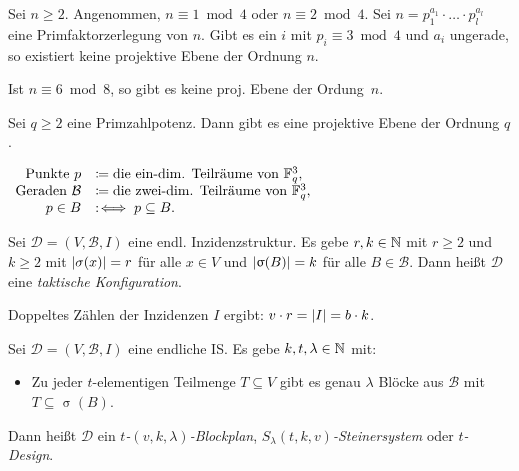 \documentclass{cheat-sheet}
\newcommand{\F}{\mathbb{F}} %
\newcommand{\Design}{\mathcal{D}} %
\newcommand{\Blocks}{\mathcal{B}} %
\begin{document}
\begin{satz}
  Sei $n \geq 2$.
  Angenommen, $n \equiv 1 \bmod 4$ oder $n \equiv 2 \bmod 4$.
  Sei $n = p_1^{a_1} \cdot \ldots \cdot p_l^{a_l}$ eine Primfaktorzerlegung von $n$.
  Gibt es ein $i$ mit $p_i \equiv 3 \bmod 4$ und $a_i$ ungerade, so existiert keine projektive Ebene der Ordnung $n$.
\end{satz}

\begin{kor}
  Ist $n \equiv 6 \bmod 8$, so gibt es keine proj. Ebene der Ordung~$n$.
\end{kor}

\begin{satz}
  Sei $q \geq 2$ eine Primzahlpotenz.
  Dann gibt es eine projektive Ebene der Ordnung $q$.
\end{satz}

\begin{konstr}
  $\begin{array}[t]{r l}
    \text{Punkte } p & \coloneqq \text{die ein-dim. Teilräume von $\F_q^3$,} \\
    \text{Geraden } \Blocks & \coloneqq \text{die zwei-dim. Teilräume von $\F_q^3$,} \\
    p \in B & \!\!\!\coloniff p \subseteq B.
  \end{array}$
\end{konstr}

\begin{defn}
  Sei $\Design = (V, \Blocks, I)$ eine endl. Inzidenzstruktur.
  Es gebe $r, k \in \mathbb{N}$ mit $r \geq 2$ und $k \geq 2$ mit $\lvert\sigma(x)\rvert = r$ für alle $x \in V$ und $\abs{\upsigma(B)} = k$ für alle $B \in \Blocks$.
  Dann heißt $\Design$ eine \emph{taktische Konfiguration}.
\end{defn}

\begin{bem}
  Doppeltes Zählen der Inzidenzen $I$ ergibt: \enspace
  $v \cdot r = \lvert I\rvert = b \cdot k$.
\end{bem}

\begin{defn}
  Sei $\Design = (V, \Blocks, I)$ eine endliche IS.
  Es gebe $k, t, \lambda \in \mathbb{N}$ mit:
  \begin{itemize}
    \miniitem{0.4 \linewidth}{$\abs{\upsigma(B)} = k$ für alle $B \in \Blocks$,}
    \item Zu jeder $t$-elementigen Teilmenge $T \subseteq V$ gibt es genau $\lambda$ Blöcke aus $\Blocks$ mit $T \subseteq \upsigma(B)$.
  \end{itemize}
  Dann heißt $\Design$ ein \emph{$t$-$(v, k, \lambda)$-Blockplan}, \emph{$S_\lambda(t, k, v)$-Steinersystem} oder \emph{$t$-Design}.
\end{defn}
\end{document}
